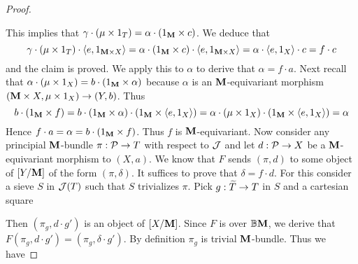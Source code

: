 \begin{proof}
\begin{center}
\end{center}
This implies that $\gamma \cdot (\mu\times 1_T) = \alpha \cdot (1_{\mathbf{M}}\times c)$. We deduce that
$$\gamma \cdot (\mu \times 1_T)\cdot \langle e, 1_{\mathbf{M}\times X}\rangle = \alpha \cdot (1_{\mathbf{M}}\times c) \cdot  \langle e, 1_{\mathbf{M}\times X}\rangle = \alpha \cdot \langle e,1_X\rangle \cdot c = f\cdot c$$
and the claim is proved. We apply this to $\alpha$ to derive that $\alpha = f\cdot a$. Next recall that $\alpha \cdot \left(\mu \times 1_X\right) = b\cdot \left(1_{\mathbf{M}} \times \alpha \right)$ because $\alpha$ is an $\mathbf{M}$-equivariant morphism $\left(\mathbf{M}\times X, \mu\times 1_X\right)\rightarrow (Y,b)$. Thus
$$b\cdot \left(1_{\mathbf{M}}\times f\right) = b\cdot \left(1_{\mathbf{M}}\times \alpha\right)\cdot \left(1_{\mathbf{M}}\times \langle e, 1_X\rangle \right) = \alpha \cdot \left(\mu \times 1_X\right)\cdot \left(1_{\mathbf{M}}\times \langle e, 1_X\rangle \right) = \alpha$$
Hence $f\cdot a = \alpha = b\cdot \left(1_{\mathbf{M}}\times f\right)$. Thus $f$ is $\mathbf{M}$-equivariant. Now consider any principial $\mathbf{M}$-bundle $\pi:{\mathcal P}\rightarrow T$ with respect to ${\mathcal J}$ and let $d:{\mathcal P}\rightarrow X$ be a $\mathbf{M}$-equivariant morphism to $(X,a)$. We know that $F$ sends $(\pi,d)$ to some object of $[Y/\mathbf{M}]$ of the form $(\pi,\delta)$. It suffices to prove that $\delta = f\cdot d$. For this consider a sieve $S$ in ${\mathcal J}(T)$ such that $S$ trivializes $\pi$. Pick $g:\widetilde{T}\rightarrow T$ in $S$ and a cartesian square
\begin{center}
\end{center}
Then $(\pi_g,d\cdot g')$ is an object of $[X/\mathbf{M}]$. Since $F$ is over $\mathbb{B}\mathbf{M}$, we derive that $F(\pi_g,d\cdot g') = (\pi_g,\delta \cdot g')$. By definition $\pi_g$ is trivial $\mathbf{M}$-bundle. Thus we have

\end{proof}

